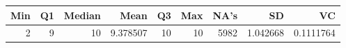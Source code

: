 
\begin{tabular}[t]{rrrrrrrrr}
\toprule
Min & Q1 & Median & Mean & Q3 & Max & NA's & SD & VC\\
\midrule
2 & 9 & 10 & 9.378507 & 10 & 10 & 5982 & 1.042668 & 0.1111764\\
\bottomrule
\end{tabular}